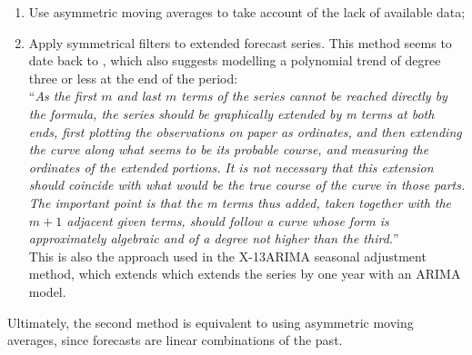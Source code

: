 \documentclass[
]{article}
\newcommand\1{\mathds{1}}
\begin{document}
\begin{enumerate}
\def\labelenumi{\arabic{enumi}.}
\item
  Use asymmetric moving averages to take account of the lack of
  available data;
\item
  Apply symmetrical filters to extended forecast series. This method
  seems to date back to \textcite{deforest1877adjustment}, which also
  suggests modelling a polynomial trend of degree three or less at the
  end of the period:\\
  ``\emph{As the first \(m\) and last \(m\) terms of the series cannot
  be reached directly by the formula, the series should be graphically
  extended by m terms at both ends, first plotting the observations on
  paper as ordinates, and then extending the curve along what seems to
  be its probable course, and measuring the ordinates of the extended
  portions.} \emph{It is not necessary that this extension should
  coincide with what would be the true course of the curve in those
  parts. } \emph{The important point is that the m terms thus added,
  taken together with the \(m+1\) adjacent given terms, should follow a
  curve whose form is approximately algebraic and of a degree not higher
  than the third.}''\\
  This is also the approach used in the X-13ARIMA seasonal adjustment
  method, which extends which extends the series by one year with an
  ARIMA model.
\end{enumerate}

Ultimately, the second method is equivalent to using asymmetric moving
averages, since forecasts are linear combinations of the past.
\end{document}
